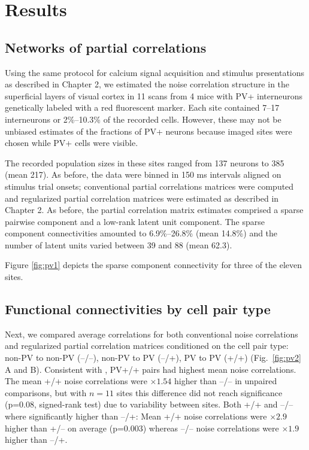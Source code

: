 \section{Results}
\subsection{Networks of partial correlations}
Using the same protocol for calcium signal acquisition  and stimulus presentations as described in Chapter 2, we estimated the noise correlation structure in the superficial layers of visual cortex in 11 scans from 4 mice with PV+ interneurons genetically labeled with a red fluorescent marker.
Each site contained 7--17 interneurons or 2\%--10.3\% of the recorded cells.  
However, these may not be unbiased estimates of the fractions of PV+ neurons because imaged sites were chosen while PV+ cells were  visible.

The recorded population sizes in these sites ranged from 137 neurons to 385 (mean 217). 
As before, the data were binned in 150 ms intervals aligned on stimulus trial onsets; conventional partial correlations matrices were computed and regularized partial correlation matrices were estimated as described in Chapter 2.
As before, the partial correlation matrix estimates comprised a sparse pairwise component and a low-rank latent unit component.
The sparse component connectivities amounted to 6.9\%--26.8\% (mean 14.8\%) and the number of latent units varied between 39 and 88 (mean 62.3).

Figure \ref{fig:pv1} depicts the sparse component connectivity for three of the eleven sites. 




\subsection{Functional connectivities by cell pair type}


Next, we compared average correlations for both conventional noise correlations and regularized partial correlation matrices conditioned on the cell pair type: 
non-PV to non-PV (--/--), non-PV to PV (--/+), PV to PV (+/+)  (Fig.~\ref{fig:pv2} A and B).
Consistent with \cite{Hofer:2011}, PV+/+ pairs had highest mean noise correlations. The mean +/+ noise correlations were $\times 1.54$ higher than --/-- in unpaired comparisons, but with $n=11$ sites this difference did not reach significance (p=0.08, signed-rank test) due to variability between sites. Both +/+ and --/-- where significantly higher than --/+: Mean +/+ noise correlations were $\times 2.9$ higher than +/-- on average (p=0.003) whereas --/-- noise correlations were $\times 1.9$ higher than --/+.

